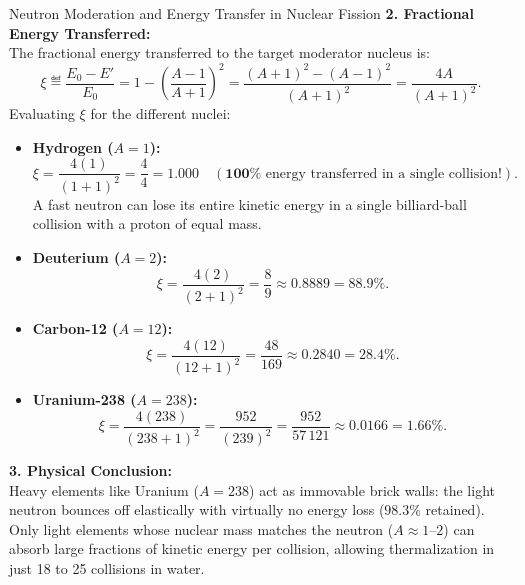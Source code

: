 \begin{workedexample}{Neutron Moderation and Energy Transfer in Nuclear Fission}
\textbf{2. Fractional Energy Transferred:}\\
The fractional energy transferred to the target moderator nucleus is:
\[
\xi \eqdef \frac{E_0 - E'}{E_0} = 1 - \left(\frac{A - 1}{A + 1}\right)^2 = \frac{(A + 1)^2 - (A - 1)^2}{(A + 1)^2} = \frac{4A}{(A + 1)^2}.
\]
Evaluating $\xi$ for the different nuclei:
\begin{itemize}[leftmargin=1.5em,itemsep=3pt]
  \item \textbf{Hydrogen ($A = 1$):}
  \[
  \xi = \frac{4(1)}{(1 + 1)^2} = \frac{4}{4} = 1.000 \quad (\mathbf{100\%} \text{ energy transferred in a single collision!}).
  \]
  A fast neutron can lose its entire kinetic energy in a single billiard-ball collision with a proton of equal mass.
  \item \textbf{Deuterium ($A = 2$):}
  \[
  \xi = \frac{4(2)}{(2 + 1)^2} = \frac{8}{9} \approx 0.8889 = 88.9\%.
  \]
  \item \textbf{Carbon-12 ($A = 12$):}
  \[
  \xi = \frac{4(12)}{(12 + 1)^2} = \frac{48}{169} \approx 0.2840 = 28.4\%.
  \]
  \item \textbf{Uranium-238 ($A = 238$):}
  \[
  \xi = \frac{4(238)}{(238 + 1)^2} = \frac{952}{(239)^2} = \frac{952}{57\,121} \approx 0.0166 = 1.66\%.
  \]
\end{itemize}

\textbf{3. Physical Conclusion:}\\
Heavy elements like Uranium ($A = 238$) act as immovable brick walls: the light neutron bounces off elastically with virtually no energy loss ($98.3\%$ retained). Only light elements whose nuclear mass matches the neutron ($A \approx 1\text{--}2$) can absorb large fractions of kinetic energy per collision, allowing thermalization in just 18 to 25 collisions in water.
\end{workedexample}

